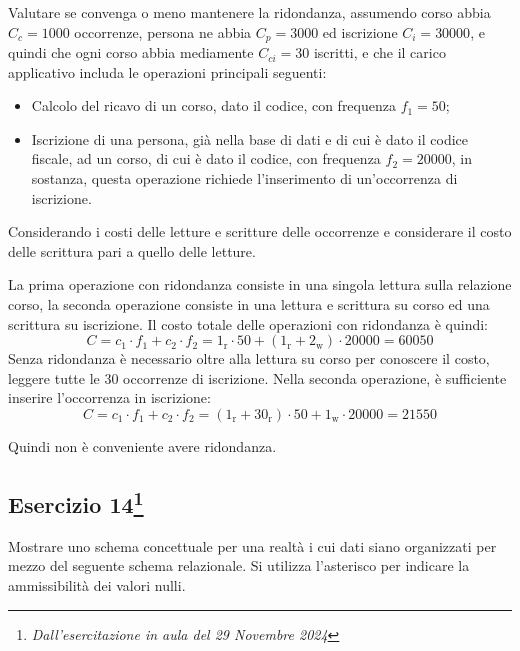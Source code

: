\documentclass{article}
\begin{document}
Valutare se convenga o meno mantenere la ridondanza, assumendo corso abbia $C_c=1000$ occorrenze, persona ne abbia $C_p=3000$ ed iscrizione 
$C_i=30000$, e quindi che ogni corso abbia mediamente $C_{ci}=30$ iscritti, e che il carico applicativo includa le operazioni principali seguenti:
\begin{itemize}
    \item Calcolo del ricavo di un corso, dato il codice, con frequenza $f_1=50$;
    \item Iscrizione di una persona, già nella base di dati e di cui è dato il codice fiscale, ad un corso, di cui è dato il codice, con 
    frequenza $f_2=20000$, in sostanza, questa operazione richiede l'inserimento di un'occorrenza di iscrizione. 
\end{itemize}

Considerando i costi delle letture e scritture delle occorrenze e considerare il costo delle scrittura pari a quello delle letture. 


La prima operazione con ridondanza consiste in una singola lettura sulla relazione corso, la seconda operazione consiste in una 
lettura e scrittura su corso ed una scrittura su iscrizione. Il costo totale delle operazioni con ridondanza è quindi:
\begin{equation*}
    C=c_1\cdot f_1+c_2\cdot f_2=1_{\mathrm{r}}\cdot50+(1_{\mathrm{r}}+2_{\mathrm{w}})\cdot20000=60050
\end{equation*}
Senza ridondanza è necessario oltre alla lettura su corso per conoscere il costo, leggere tutte le 30 occorrenze di iscrizione. Nella seconda operazione, 
è sufficiente inserire l'occorrenza in iscrizione:
\begin{equation*}
    C=c_1\cdot f_1+c_2\cdot f_2=(1_{\mathrm{r}}+30_\mathrm{r})\cdot50+1_\mathrm{w}\cdot20000=21550
\end{equation*}

Quindi non è conveniente avere ridondanza. 

\subsection{Esercizio 14\footnote{\textit{Dall'esercitazione in aula del 29 Novembre 2024}}}

Mostrare uno schema concettuale per una realtà i cui dati siano organizzati per mezzo del seguente 
schema relazionale. Si utilizza l'asterisco per indicare la ammissibilità dei valori nulli.
\end{document}
